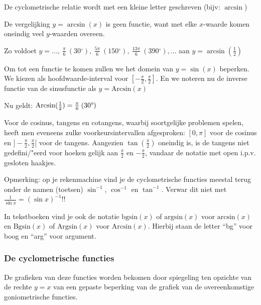 \noindent De cyclometrische relatie wordt met een kleine letter geschreven
(bijv: $\arcsin$)

\medskip{}


\noindent De vergelijking $y=\arcsin(x)$ is geen functie, want met
elke $x$-waarde komen oneindig veel $y$-waarden overeen. \medskip{}


\noindent Zo voldoet $y=...,\:\frac{\pi}{6}\:(30{^\circ}),\:\frac{5\pi}{6}\:(150{^\circ}),\:\frac{13\pi}{6}\:(390{^\circ}),...$
aan $y=\arcsin(\frac{1}{2})$

\medskip{}


\noindent Om tot een functie te komen zullen we het domein van $y=\sin(x)$
beperken. We kiezen als hoofdwaarde-interval voor $[-\frac{\pi}{2},\frac{\pi}{2}]$.
En we noteren nu de inverse functie van de sinusfunctie als $y=\textrm{Arcsin}(x)$

\noindent Nu geldt: $\textrm{Arcsin}(\frac{1}{2})=\frac{\pi}{6}\:(30\text{\textdegree})$

\medskip{}


Voor de cosinus, tangens en cotangens, waarbij soortgelijke problemen
spelen, heeft men eveneens zulke voorkeursintervallen afgesproken:
$[0,\pi]$ voor de cosinus en $]-\frac{\pi}{2},\frac{\pi}{2}[$ voor
de tangens. Aangezien $\tan(\frac{\pi}{2})$ oneindig is, is de tangens
niet gedefini/"eerd voor hoeken gelijk aan $\frac{\pi}{2}$ en $-\frac{\pi}{2}$,
vandaar de notatie met open i.p.v. gesloten haakjes.

\medskip{}


\noindent Opmerking: op je rekenmachine vind je de cyclometrische
functies meestal terug onder de namen (toetsen) ${\displaystyle \sin^{-1}}$,
${\displaystyle \cos^{-1}}$ en ${\displaystyle \tan^{-1}}$. Verwar
dit niet met ${\displaystyle \frac{1}{\sin x}=\left(\sin x\right)^{-1}}$!!

\noindent In tekstboeken vind je ook de notatie $\textrm{bgsin}(x)$
of $\textrm{argsin}(x)$ voor $\textrm{arcsin}(x)$ en $\textrm{Bgsin}(x)$
of $\textrm{Argsin}(x)$ voor $\textrm{Arcsin}(x)$. Hierbij staan
de letter ``bg'' voor boog en ``arg'' voor argument.


\subsubsection{De cyclometrische functies}

De grafieken van deze functies worden bekomen door spiegeling ten
opzichte van de rechte $y=x$ van een gepaste beperking van de grafiek
van de overeenkomstige goniometrische functies.

